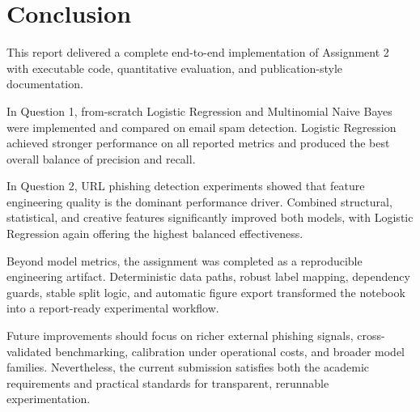 \section{Conclusion}

This report delivered a complete end-to-end implementation of Assignment 2 with executable code, quantitative evaluation, and publication-style documentation.

In Question 1, from-scratch Logistic Regression and Multinomial Naive Bayes were implemented and compared on email spam detection. Logistic Regression achieved stronger performance on all reported metrics and produced the best overall balance of precision and recall.

In Question 2, URL phishing detection experiments showed that feature engineering quality is the dominant performance driver. Combined structural, statistical, and creative features significantly improved both models, with Logistic Regression again offering the highest balanced effectiveness.

Beyond model metrics, the assignment was completed as a reproducible engineering artifact. Deterministic data paths, robust label mapping, dependency guards, stable split logic, and automatic figure export transformed the notebook into a report-ready experimental workflow.

Future improvements should focus on richer external phishing signals, cross-validated benchmarking, calibration under operational costs, and broader model families. Nevertheless, the current submission satisfies both the academic requirements and practical standards for transparent, rerunnable experimentation.
